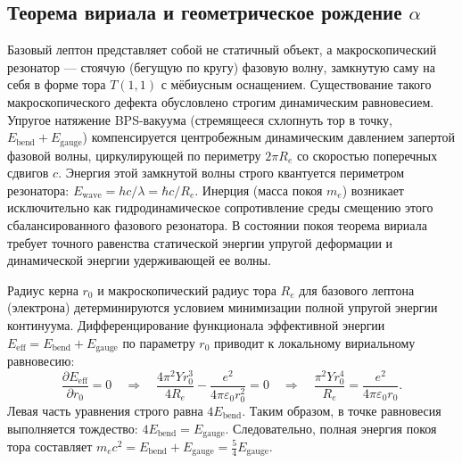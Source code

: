 \documentclass[11pt,a4paper]{article}
\begin{document}
	\subsection{Теорема вириала и геометрическое рождение $\alpha$}
	\label{virial}
	Базовый лептон представляет собой не статичный объект, а макроскопический резонатор — стоячую (бегущую по кругу) фазовую волну, замкнутую саму на себя в форме тора $T(1,1)$ с мёбиусным оснащением.
	Существование такого макроскопического дефекта обусловлено строгим динамическим равновесием. Упругое натяжение BPS-вакуума (стремящееся схлопнуть тор в точку, $E_{\text{bend}} + E_{\text{gauge}}$) компенсируется центробежным динамическим давлением запертой фазовой волны, циркулирующей по периметру $2\pi R_e$ со скоростью поперечных сдвигов $c$. Энергия этой замкнутой волны строго квантуется периметром резонатора: $E_{\text{wave}} = hc / \lambda = \hbar c / R_e$.
	Инерция (масса покоя $m_e$) возникает исключительно как гидродинамическое сопротивление среды смещению этого сбалансированного фазового резонатора. В состоянии покоя теорема вириала требует точного равенства статической энергии упругой деформации и динамической энергии удерживающей ее волны.
	
	Радиус керна $r_0$ и макроскопический радиус тора $R_e$ для базового лептона (электрона) детерминируются условием минимизации полной упругой энергии континуума. 
	Дифференцирование функционала эффективной энергии $E_{\text{eff}} = E_{\text{bend}} + E_{\text{gauge}}$ по параметру $r_0$ приводит к локальному вириальному равновесию:
	\begin{equation}
		\frac{\partial E_{\text{eff}}}{\partial r_0} = 0 \quad \Longrightarrow \quad \frac{4 \pi^2 Y r_0^3}{4R_e} - \frac{e^2}{4\pi\varepsilon_0 r_0^2} = 0 \quad \Longrightarrow \quad \frac{\pi^2 Y r_0^4}{R_e} = \frac{e^2}{4\pi\varepsilon_0 r_0}.
	\end{equation}
	Левая часть уравнения строго равна $4 E_{\text{bend}}$. Таким образом, в точке равновесия выполняется тождество: $4 E_{\text{bend}} = E_{\text{gauge}}$. 
	Следовательно, полная энергия покоя тора составляет $m_e c^2 = E_{\text{bend}} + E_{\text{gauge}} = \frac{5}{4} E_{\text{gauge}}$. 
	
\end{document}
